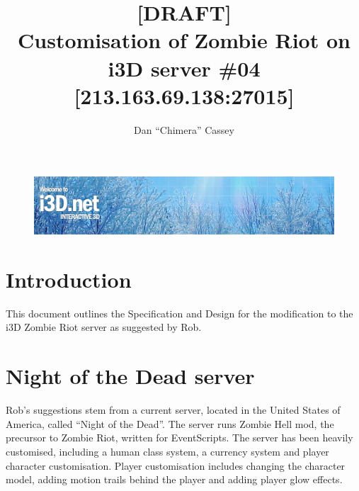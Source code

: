 \documentclass[a4paper, 11pt]{article}
\begin{document}
\title{[DRAFT]\\Customisation of Zombie Riot on\\i3D server \#04 [213.163.69.138:27015]}
\author{Dan ``Chimera'' Cassey}
\begin{figure}
\vspace{-20pt}
\includegraphics[width=\textwidth]{header-en.jpg}
\vspace{-60pt}
\end{figure}
\maketitle
\section{Introduction}
This document outlines the Specification and Design for the modification to the i3D Zombie Riot server as suggested by Rob.
\section{Night of the Dead server}
Rob's suggestions stem from a current server, located in the United States of America, called ``Night of the Dead''. The server runs Zombie Hell mod, the precursor to Zombie Riot, written for EventScripts. The server has been heavily customised, including a human class system, a currency system and player character customisation. Player customisation includes changing the character model, adding motion trails behind the player and adding player glow effects.
\end{document}
